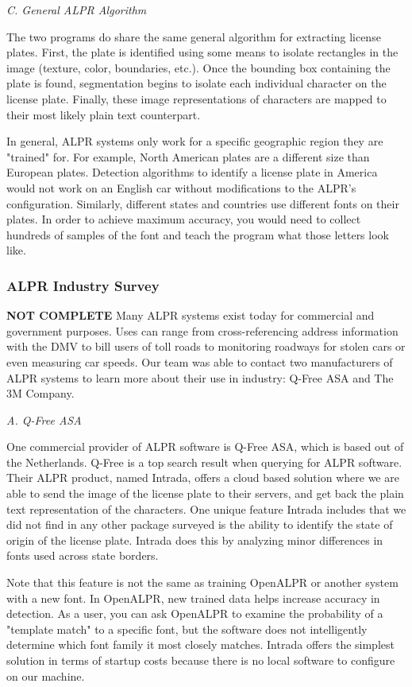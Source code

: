 \documentclass[11pt, oneside, fullpage, doublespace]{article}
\begin{document}
\emph{C. General ALPR Algorithm}

The two programs do share the same general algorithm for extracting license plates. First, the plate is identified using some means to isolate rectangles in the image (texture, color, boundaries, etc.). Once the bounding box containing the plate is found, segmentation begins to isolate each individual character on the license plate. Finally, these image representations of characters are mapped to their most likely plain text counterpart.

In general, ALPR systems only work for a specific geographic region they are "trained" for. For example, North American plates are a different size than European plates. Detection algorithms to identify a license plate in America would not work on an English car without modifications to the ALPR's configuration. Similarly, different states and countries use different fonts on their plates. In order to achieve maximum accuracy, you would need to collect hundreds of samples of the font and teach the program what those letters look like.


\subsubsection{ALPR Industry Survey}
{\color{red}\textbf{NOT COMPLETE}}
Many ALPR systems exist today for commercial and government purposes. Uses can range from cross-referencing address information with the DMV to bill users of toll roads to monitoring roadways for stolen cars or even measuring car speeds. Our team was able to contact two manufacturers of ALPR systems to learn more about their use in industry: Q-Free ASA and The 3M Company.

\emph{A. Q-Free ASA}

One commercial provider of ALPR software is Q-Free ASA, which is based out of the Netherlands. Q-Free is a top search result when querying for ALPR software. Their ALPR product, named Intrada, offers a cloud based solution where we are able to send the image of the license plate to their servers, and get back the plain text representation of the characters. One unique feature Intrada includes that we did not find in any other package surveyed is the ability to identify the state of origin of the license plate. Intrada does this by analyzing minor differences in fonts used across state borders.

Note that this feature is not the same as training OpenALPR or another system with a new font. In OpenALPR, new trained data helps increase accuracy in detection. As a user, you can ask OpenALPR to examine the probability of a "template match" to a specific font, but the software does not intelligently determine which font family it most closely matches. Intrada offers the simplest solution in terms of startup costs because there is no local software to configure on our machine.
\end{document}
